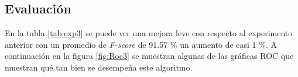 \subsection{Evaluación}
\begin{center}
	
\end{center}

\par En la tabla \ref{tab:exp3} se puede ver una mejora leve con respecto al experimento anterior con un promedio de \textit{F-score} de 91.57 \% un aumento de casi 1 \%. A continuación en la figura \ref{fig:Roc3}  se muestran algunas de las gráficas ROC que muestran qué tan bien se desempeña este algoritmo.

\begin{figure}

	\begin{table}[H]
		\centering
\end{table}
\end{figure}
